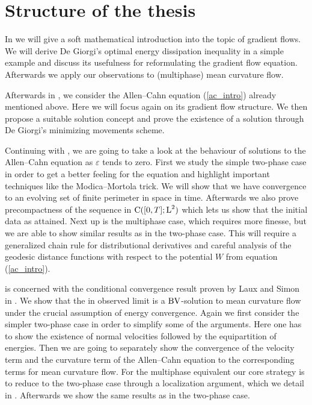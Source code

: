 \section{Structure of the thesis}

In  we will give a soft mathematical 
introduction into the topic of gradient flows. We will derive De Giorgi's 
optimal energy dissipation inequality in a simple example and discuss its 
usefulness for 
reformulating the gradient flow equation. Afterwards we apply our observations 
to (multiphase) mean curvature flow.

Afterwards in , we consider the Allen--Cahn equation 
(\ref{ac_intro}) already mentioned above. Here we will focus again on its 
gradient flow structure. We then propose a suitable solution concept and prove 
the existence of a solution through De Giorgi's minimizing movements scheme.

Continuing with , we are going 
to take a look at the behaviour of solutions to the Allen--Cahn equation as $ 
\varepsilon $ tends to zero. First we study the simple two-phase case in order 
to get a better feeling for the equation and highlight important techniques 
like the Modica--Mortola trick. We will show that we have convergence to an 
evolving set of finite perimeter in space in time. Afterwards we also prove 
precompactness of the sequence in $ \operatorname{C} ( [ 0 , T ] ; \operatorname{L}^{ 2 } ) $ which 
lets us show that the initial data as attained. Next up is the multiphase case, 
which requires more finesse, but we are able to show similar results as in the 
two-phase case. This will require a generalized chain rule for distributional 
derivatives and careful analysis of the geodesic distance functions with 
respect to the potential $ W $ from equation (\ref{ac_intro}).

 is concerned with the conditional 
convergence result proven by Laux and Simon in 
\cite{convergence_of_allen_cahn_equation_to_multiphase_mean_curvature_flow}. We 
show that the in  observed 
limit is a $ \operatorname{BV} $-solution to mean curvature flow under the crucial assumption 
of energy convergence. Again we first consider the simpler two-phase case in 
order to simplify some of the arguments. Here one has to show the existence of 
normal velocities followed by the equipartition of energies. Then we are going 
to separately show the convergence of the velocity term and the curvature term 
of the Allen--Cahn equation to the corresponding terms for mean curvature flow. 
For the multiphase equivalent our core strategy is to reduce to the two-phase 
case through a localization argument, which we detail in 
. Afterwards we show the same results as 
in the two-phase case.

